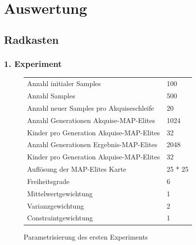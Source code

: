 \section{Auswertung}

\subsection{Radkasten}

\subsubsection{1. Experiment}

\begin{figure}[h]
	\centering
	\begin{tabularx}{.75\textwidth}{ll}\hline
		Anzahl initialer Samples & 100 \\
		Anzahl Samples & 500 \\
		Anzahl neuer Samples pro Akquiseschleife & 20 \\
		Anzahl Generationen Akquise-MAP-Elites & 1024 \\
		Kinder pro Generation Akquise-MAP-Elites & 32 \\
		Anzahl Generationen Ergebnis-MAP-Elites & 2048 \\
		Kinder pro Generation Akquise-MAP-Elites & 32 \\
		Auflösung der MAP-Elites Karte & 25 * 25  \\
		\hline
		Freiheitsgrade & 6 \\
		Mittelwertgewichtung & 1 \\
		Varianzgewichtung & 2 \\
		Constraintgewichtung & 1 \\
	\end{tabularx}
	\caption{Parametrisierung des ersten Experiments}
	\label{tab:param1st}
\end{figure}

